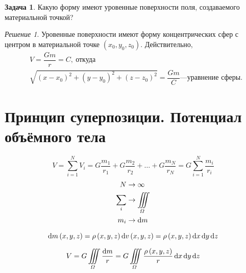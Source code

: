 \documentclass[11pt, a4paper]{article}
\theoremstyle{plain}
\theoremstyle{definition}
\newtheorem{problem}{Задача}[section]
\theoremstyle{remark}
\newtheorem*{solution}{Решение}
\begin{document}
\begin{problem}
    Какую форму имеют уровенные поверхности поля, создаваемого материальной точкой?
\end{problem}
\begin{solution}
    Уровенные поверхности имеют форму концентрических сфер с центром в материальной точке $(x_0, y_0, z_0)$. Действительно,
    \begin{align*}
        &V = \dfrac{Gm}{r} = C,\ \text{откуда} \\
        &\sqrt{\left( x - x_0 \right)^2 +
        \left( y - y_0 \right)^2 + \left( z - z_0 \right)^2} = \dfrac{Gm}{C} \text{---уравнение
        сферы}. 
    \end{align*}
\end{solution}

\section{Принцип суперпозиции. Потенциал объёмного тела}
\begin{equation*}
    V = \sum\limits_{i=1}^{N} V_i = G\dfrac{m_1}{r_1} + G\dfrac{m_2}{r_2} + \dots +
    G\dfrac{m_N}{r_N} = G\sum\limits_{i=1}^{N} \dfrac{m_i}{r_i}
\end{equation*}
\begin{align*}
    N &\to \infty\\
    \sum\limits_{i}&\to\iiint\limits_{\Omega} \\
    m_i&\to\dif m
\end{align*}

\begin{equation*}
    \dif m\left( x, y, z \right) = \rho\left( x, y, z \right)\dif v\left( x, y, z \right) = \rho\left( x, y, z \right)\dif x\dif y\dif z
\end{equation*}

\begin{equation*}
    V = G\iiint\limits_{\Omega}\dfrac{\dif m}{r} = 
    G\iiint\limits_{\Omega}\dfrac{\rho\left( x, y, z \right)}{r}\dif x\dif y\dif z
\end{equation*}

\printbibliography
\end{document}
